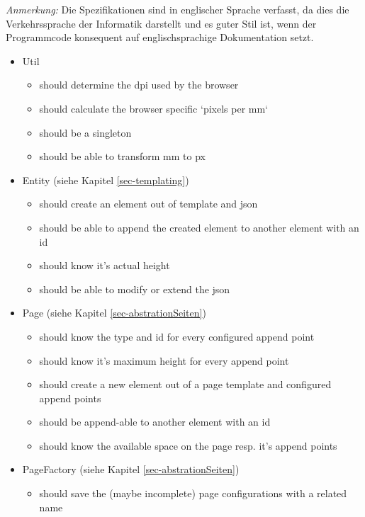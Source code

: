 \emph{Anmerkung:}
Die Spezifikationen sind in englischer Sprache verfasst, da dies die
Verkehrssprache der Informatik darstellt und es guter Stil ist, wenn der
Programmcode konsequent auf englischsprachige Dokumentation setzt.

\begin{itemize}
  \item Util
    \begin{itemize}
      \item should determine the dpi used by the browser
      \item should calculate the browser specific `pixels per mm`
      \item should be a singleton
      \item should be able to transform mm to px
    \end{itemize}
  \item Entity (siehe Kapitel \ref{sec-templating})
    \begin{itemize}
      \item should create an element out of template and json
      \item should be able to append the created element to another
            element with an id
      \item should know it's actual height
      \item should be able to modify or extend the json
    \end{itemize}
  \item Page (siehe Kapitel \ref{sec-abstrationSeiten})
    \begin{itemize}
      \item should know the type and id for every configured append point
      \item should know it's maximum height for every append point
      \item should create a new element out of a page template and
            configured append points
      \item should be append-able to another element with an id
      \item should know the available space on the page resp. it's
            append points
    \end{itemize}
  \item PageFactory (siehe Kapitel \ref{sec-abstrationSeiten})
    \begin{itemize}
      \item should save the (maybe incomplete) page configurations
            with a related name

\end{itemize}
\end{itemize}
